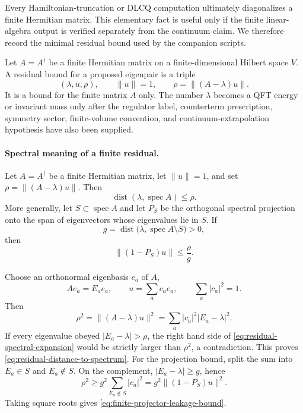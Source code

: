 Every Hamiltonian-truncation or DLCQ computation ultimately diagonalizes a
finite Hermitian matrix.  This elementary fact is useful only if the finite
linear-algebra output is verified separately from the continuum claim.  We
therefore record the minimal residual bound used by the companion scripts.

\begin{definition}
\label{def:finite-truncation-residual-bound}
Let \(A=A^\dagger\) be a finite Hermitian matrix on a finite-dimensional
Hilbert space \(V\).  A residual bound for a proposed eigenpair is a
triple
\begin{equation}
  (\lambda,u,\rho),\qquad \|u\|=1,\qquad
  \rho=\|(A-\lambda)u\|.
  \label{eq:finite-matrix-residual-bound}
\end{equation}
It is a bound for the finite matrix \(A\) only.  The number
\(\lambda\) becomes a QFT energy or invariant mass only after the regulator
label, counterterm prescription, symmetry sector, finite-volume convention,
and continuum-extrapolation hypothesis have also been supplied.
\end{definition}

\paragraph{Spectral meaning of a finite residual.}
Let \(A=A^\dagger\) be a finite Hermitian matrix, let
\(\|u\|=1\), and set \(\rho=\|(A-\lambda)u\|\).
Then
\begin{equation}
  \operatorname{dist}(\lambda,\operatorname{spec}A)\leq \rho .
  \label{eq:residual-distance-to-spectrum}
\end{equation}
More generally, let \(S\subset\operatorname{spec}A\) and let \(P_S\) be the
orthogonal spectral projection onto the span of eigenvectors whose
eigenvalues lie in \(S\).  If
\begin{equation}
  g=\operatorname{dist}\bigl(\lambda,\operatorname{spec}A\setminus S\bigr)>0,
  \label{eq:finite-spectral-gap-from-complement}
\end{equation}
then
\begin{equation}
  \|(1-P_S)u\|\leq \frac{\rho}{g}.
  \label{eq:finite-projector-leakage-bound}
\end{equation}

Choose an orthonormal eigenbasis \(e_a\) of \(A\),
\[
  Ae_a=E_a e_a,\qquad u=\sum_a c_a e_a,\qquad \sum_a |c_a|^2=1.
\]
Then
\begin{equation}
  \rho^2
  =
  \|(A-\lambda)u\|^2
  =
  \sum_a |c_a|^2 |E_a-\lambda|^2 .
  \label{eq:residual-spectral-expansion}
\end{equation}
If every eigenvalue obeyed \(|E_a-\lambda|>\rho\), the right hand side of
\eqref{eq:residual-spectral-expansion} would be strictly larger than
\(\rho^2\), a contradiction.  This proves
\eqref{eq:residual-distance-to-spectrum}.  For the projection bound, split
the sum into \(E_a\in S\) and \(E_a\notin S\).  On the complement,
\(|E_a-\lambda|\geq g\), hence
\[
  \rho^2
  \geq
  g^2\sum_{E_a\notin S}|c_a|^2
  =
  g^2\|(1-P_S)u\|^2 .
\]
Taking square roots gives
\eqref{eq:finite-projector-leakage-bound}.

